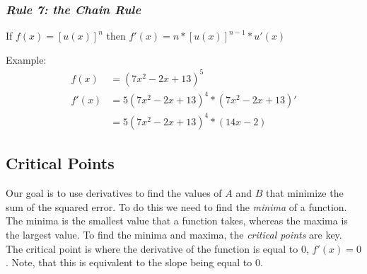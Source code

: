 \documentclass[11pt,openany]{book}\usepackage[]{graphicx}\usepackage[]{color}
\begin{document}
\subsubsection{\textit{Rule 7: the Chain Rule}}

\begin{center}
   If $f(x)=[u(x)]^{n}$ then $f'(x)=n*[u(x)]^{n-1}*u'(x)$ 
  \end{center}
\noindent Example: 
\begin{align*}
f(x) &= (7x^{2}-2x+13)^{5} \\ 
f'(x)&=5(7x^{2}-2x+13)^{4}*(7x^{2}-2x+13)' \\
&=5(7x^{2}-2x+13)^{4}*(14x-2)
\end{align*}

\subsection{Critical Points}

Our goal is to use derivatives to find the values of $A$ and $B$ that minimize the sum of the squared error. To do this we need to find the \textit{minima} of a function. The minima is the smallest value that a function takes, whereas the maxima is the largest value. To find the minima and maxima, the \textit{critical points} are key. The critical point is where the derivative of the function is equal to $0$, $f'(x)=0$. Note, that this is equivalent to the slope being equal to $0$. 

\begin{grbox}
\end{grbox}
\end{document}
